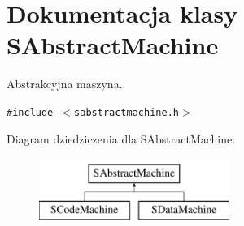 \hypertarget{classSAbstractMachine}{
\section{Dokumentacja klasy SAbstractMachine}
\label{classSAbstractMachine}
}
Abstrakcyjna maszyna.  


{\tt \#include $<$sabstractmachine.h$>$}

Diagram dziedziczenia dla SAbstractMachine:\begin{figure}[H]
\begin{center}
\leavevmode
\includegraphics[height=2cm]{classSAbstractMachine}
\end{center}
\end{figure}
